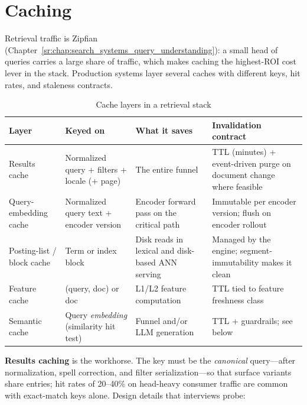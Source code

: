 \section{Caching}
\label{sr:sec:caching}

Retrieval traffic is Zipfian (Chapter~\ref{sr:chap:search_systems_query_understanding}): a small head of queries carries a large share of traffic, which makes caching the highest-ROI cost lever in the stack. Production systems layer several caches with different keys, hit rates, and staleness contracts.

\begin{table}[H]
\centering
\small
\caption{Cache layers in a retrieval stack}
\label{sr:tab:cache_layers}
\begin{tabularx}{\textwidth}{lXXX}
\toprule
\textbf{Layer} & \textbf{Keyed on} & \textbf{What it saves} & \textbf{Invalidation contract} \\
\midrule
Results cache & Normalized query + filters + locale (+ page) & The entire funnel & TTL (minutes) + event-driven purge on document change where feasible \\
Query-embedding cache & Normalized query text + encoder version & Encoder forward pass on the critical path & Immutable per encoder version; flush on encoder rollout \\
Posting-list / block cache & Term or index block & Disk reads in lexical and disk-based ANN serving & Managed by the engine; segment-immutability makes it clean \\
Feature cache & (query, doc) or doc & L1/L2 feature computation & TTL tied to feature freshness class \\
Semantic cache & Query \textit{embedding} (similarity hit test) & Funnel and/or LLM generation & TTL + guardrails; see below \\
\bottomrule
\end{tabularx}
\end{table}

\textbf{Results caching} is the workhorse. The key must be the \textit{canonical} query---after normalization, spell correction, and filter serialization---so that surface variants share entries; hit rates of 20--40\% on head-heavy consumer traffic are common with exact-match keys alone. Design details that interviews probe:

